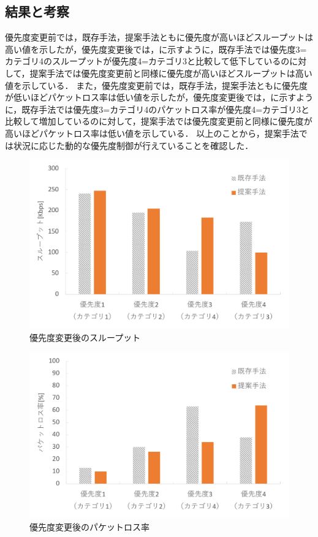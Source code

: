 \documentclass[a4paper,10pt,twocolumn,uplatex]{jsarticle}
\begin{document}
\subsection{結果と考察}
優先度変更前では，既存手法，提案手法ともに優先度が高いほどスループットは高い値を示したが，優先度変更後では，に示すように，既存手法では優先度3=カテゴリ4のスループットが優先度4=カテゴリ3と比較して低下しているのに対して，提案手法では優先度変更前と同様に優先度が高いほどスループットは高い値を示している．
また，優先度変更前では，既存手法，提案手法ともに優先度が低いほどパケットロス率は低い値を示したが，優先度変更後では，に示すように，既存手法では優先度3=カテゴリ4のパケットロス率が優先度4=カテゴリ3と比較して増加しているのに対して，提案手法では優先度変更前と同様に優先度が高いほどパケットロス率は低い値を示している．
以上のことから，提案手法では状況に応じた動的な優先度制御が行えていることを確認した．

\begin{figure}[t]
	\begin{centering}
    \includegraphics[width=0.9\linewidth]{img/throughput_resume3.pdf}
    \caption{優先度変更後のスループット}
    \label{fig:throughput}
    \end{centering}
\end{figure}

\begin{figure}[t]
	\begin{centering}
    \includegraphics[width=0.9\linewidth]{img/packetloss_resume3.pdf}
    \caption{優先度変更後のパケットロス率}
    \label{fig:packetloss}
    \end{centering}
\end{figure}
\end{document}
